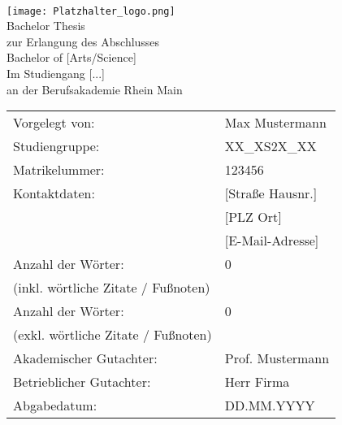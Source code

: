 \begin{center}
     \\[3ex]
    \texttt{[image: Platzhalter\_logo.png]} \\[3ex]
    \large{Bachelor Thesis\\ [-10pt]
        zur Erlangung des Abschlusses\\ [-10pt]
        Bachelor of [Arts/Science]\\
        Im Studiengang [...]\\ [-10pt]
        an der Berufsakademie Rhein Main
}
\end{center}

\renewcommand{\arraystretch}{2.5}
\begin{table}[h]
    \setlength{\tabcolsep}{32pt}
    \begin{tabularx}{\textwidth}{l l}
        Vorgelegt von:                      & Max Mustermann   \\ [-15pt]
        Studiengruppe:                      & XX\_XS2X\_XX     \\ [-15pt]
        Matrikelummer:                      & 123456           \\ [-15pt]
        Kontaktdaten:                       & [Straße Hausnr.] \\ [-15pt]
        ~                                   & [PLZ Ort]        \\ [-15pt]
        ~                                   & [E-Mail-Adresse] \\
        Anzahl der Wörter:                  & 0                \\ [-18pt]
        (inkl. wörtliche Zitate / Fußnoten) & ~                \\
        Anzahl der Wörter:                  & 0                \\ [-18pt]
        (exkl. wörtliche Zitate / Fußnoten) & ~                \\
        Akademischer Gutachter:             & Prof. Mustermann \\ [-15pt]
        Betrieblicher Gutachter:            & Herr Firma       \\
        Abgabedatum:                        & DD.MM.YYYY       \\
    \end{tabularx}
\end{table}